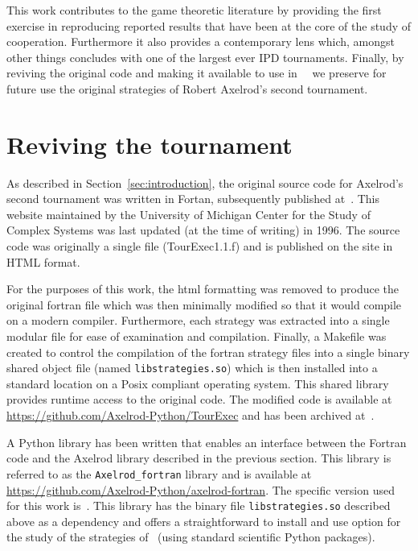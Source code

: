 \documentclass{article}
\begin{document}
This work contributes to the game theoretic literature by providing the first
exercise in reproducing reported results that have been at the core of the study
of cooperation. Furthermore it also provides a contemporary lens which, amongst
other things concludes with one of the largest ever IPD tournaments.
Finally, by reviving the original code and making it available to use
in~\cite{AxelrodProject}~ we preserve for future use the original strategies of
Robert Axelrod's second tournament.

\section{Reviving the tournament}\label{sec:reviving}

As described in Section~\ref{sec:introduction}, the original source code for
Axelrod's second tournament was written in Fortan,
subsequently published at~\cite{Axelrod1980bCode}. This
website maintained by the University of Michigan Center for the Study of Complex
Systems was last updated (at the time of writing) in 1996. The source code was
originally a single file (TourExec1.1.f) and is published on the site in HTML format.

For the purposes of this work, the html formatting was removed to produce the original
fortran file which was then minimally modified so that it would compile on a modern
compiler. Furthermore, each strategy was extracted into a single modular file for ease
of examination and compilation. Finally, a Makefile was created to control the compilation
of the fortran strategy files into a single binary shared object file (named
\texttt{libstrategies.so}) which is then installed into a standard location on
a Posix compliant operating system. This shared library provides runtime access to the
original code. The modified code is available at \url{https://github.com/Axelrod-Python/TourExec}
and has been archived at~\cite{TourExec}.

A Python library has been written that enables an interface between the Fortran code and
the Axelrod library described in the previous section. This library is referred
to as the \texttt{Axelrod\_fortran} library and is available
at \url{https://github.com/Axelrod-Python/axelrod-fortran}. The specific
version used for this work is~\cite{Axelrod_fortran}.
This library has the binary file \texttt{libstrategies.so} described above as
a dependency and offers a straightforward to install and use option
for the study of the strategies of~\cite{Axelrod1980b} (using standard
scientific Python packages).
\end{document}
